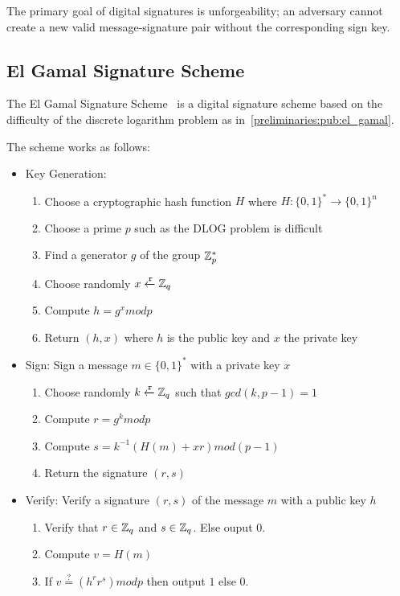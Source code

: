 The primary goal of digital signatures is unforgeability; an adversary cannot create a new valid message-signature pair without the corresponding sign key.

\subsection{El Gamal Signature Scheme}
\label{preliminaries:sign:el_gamal}

The El Gamal Signature Scheme~\cite{el_gamal} is a digital signature scheme based on the difficulty of the discrete logarithm problem as in~\ref{preliminaries:pub:el_gamal}.

The scheme works as follows:

\begin{itemize}
  \item Key Generation:
    \begin{enumerate}
      \item Choose a cryptographic hash function $H$ where $H: \{0, 1\}^{*} \rightarrow \{0, 1\}^{n}$
      \item Choose a prime $p$ such as the DLOG problem is difficult
      \item Find a generator $g$ of the group $\mathbb{Z}^{*}_{p}$
      \item Choose randomly $x \xleftarrow{\mathtt{r}}{\mathbb{Z}_q}$
      \item Compute $h = g^{x} modp$
      \item Return $(h, x)$ where $h$ is the public key and $x$ the private key
    \end{enumerate}
  \item Sign: Sign a message $m \in \{0, 1\}^{*}$ with a private key $x$
    \begin{enumerate}
      \item Choose randomly $k \xleftarrow{\mathtt{r}}{\mathbb{Z}_q}$ such that $gcd(k, p − 1) = 1$
      \item Compute $r = g^{k}modp$
      \item Compute $s = k^{-1}(H(m) + xr) mod(p - 1)$
      \item Return the signature $(r, s)$
    \end{enumerate}
  \item Verify: Verify a signature $(r, s)$ of the message $m$ with a public key $h$
    \begin{enumerate}
      \item Verify that $r \in \mathbb{Z}_q$ and $s \in \mathbb{Z}_q$. Else ouput $0$.
      \item Compute $v = H(m)$
      \item If $v \stackrel{?}{=} (h^{r}r^{s}) modp$ then output $1$ else $0$.
    \end{enumerate}
\end{itemize}

